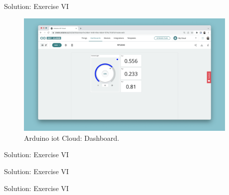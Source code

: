 \begin{frame}{Solution: Exercise VI}
    \begin{figure}
        \includegraphics[width=0.95\textwidth]{images/microcontroller/iot-cloud/dashboard.png}
        \caption{Arduino\textregistered{} \acs{iot} Cloud: Dashboard.}
    \end{figure}
\end{frame}

\begin{frame}{Solution: Exercise VI}
    \begin{listing}[H]
        \caption{Solution for Exercise VI (\texttt{setup()}).}
        \label{lst:arduino:exercise:6:solution:setup}
    \end{listing}
\end{frame}

\begin{frame}{Solution: Exercise VI}
    \begin{listing}[H]
        \caption{Solution for Exercise VI (\texttt{loop()}).}
        \label{lst:arduino:exercise:6:solution:loop}
    \end{listing}
\end{frame}

\begin{frame}{Solution: Exercise VI}
    \begin{listing}[H]
        \caption{Solution for Exercise VI (\texttt{thingProperties.h}).}
        \label{lst:arduino:exercise:6:solution:thing_properties}
    \end{listing}
\end{frame}